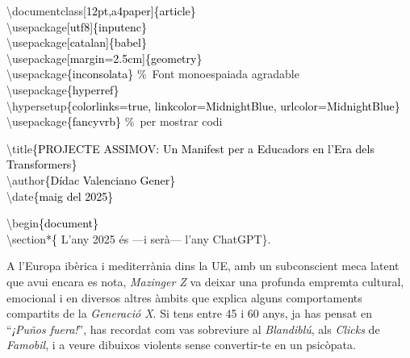 \documentclass[12pt,a4paper]{article}
\title{}
\author{}
\date{}
\begin{document}
\noindent
\ttfamily
\textcolor{mygreen}{\textbackslash documentclass}\textcolor{black}{[12pt,a4paper]\{article\}}\\
\textcolor{mygreen}{\textbackslash usepackage}\textcolor{black}{[utf8]\{inputenc\}}\\
\textcolor{mygreen}{\textbackslash usepackage}\textcolor{black}{[catalan]\{babel\}}\\
\textcolor{mygreen}{\textbackslash usepackage}\textcolor{black}{[margin=2.5cm]\{geometry\}}\\
\textcolor{mygreen}{\textbackslash usepackage}\textcolor{black}{\{inconsolata\}} \textcolor{mygray}{\%\ Font monoespaiada agradable}\\
\textcolor{mygreen}{\textbackslash usepackage}\textcolor{black}{\{hyperref\}}\\
\textcolor{mygreen}{\textbackslash hypersetup}\textcolor{black}{\{colorlinks=true, linkcolor=MidnightBlue, urlcolor=MidnightBlue\}}\\
\textcolor{mygreen}{\textbackslash usepackage}\textcolor{black}{\{fancyvrb\}} \textcolor{mygray}{\%\ per mostrar codi}

\medskip

\noindent\textcolor{mygreen}{\textbackslash title}\textcolor{black}{\{PROJECTE ASSIMOV: Un Manifest per a Educadors en l'Era dels Transformers\}}\\
\textcolor{mygreen}{\textbackslash author}\textcolor{black}{\{Dídac Valenciano Gener\}}\\
\textcolor{mygreen}{\textbackslash date}\textcolor{black}{\{maig del 2025\}}

\medskip

\noindent\textcolor{mygreen}{\textbackslash begin}\textcolor{black}{\{document\}}\\
\textcolor{mygreen}{\textbackslash section*}\textcolor{black} \{ \sffamily L’any 2025 és —i serà— l’any ChatGPT\}.\\
				
				\bigskip
				
				A l'Europa ibèrica i mediterrània dins la UE, amb un subconscient meca latent que avui encara es nota, \emph{Mazinger Z} va deixar una profunda empremta cultural, emocional i en diversos altres àmbits que explica alguns comportaments compartits de la \emph{Generació X}. Si tens entre 45 i 60 anys, ja has pensat en “\emph{¡Puños fuera!}”, has recordat com vas sobreviure al \emph{Blandiblú}, als \emph{Clicks} de \emph{Famobil}, i a veure dibuixos violents sense convertir-te en un psicòpata.
				
\end{document}
